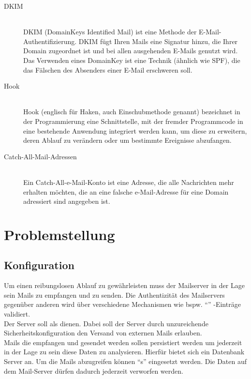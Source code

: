 \documentclass[a4paper,11pt,singlespacing]{article}
\begin{document}
\begin{description}
	\item[DKIM\label{itm:DKIM}]\hfill \\
		DKIM (DomainKeys Identified Mail) ist eine Methode der E-Mail-Authentifizierung. DKIM fügt Ihren Mails eine Signatur hinzu, die Ihrer Domain zugeordnet ist und bei allen ausgehenden E-Mails genutzt wird. Das Verwenden eines DomainKey ist eine Technik (ähnlich wie SPF), die das Fälschen des Absenders einer E-Mail erschweren soll.\cite{DKIM}
	\item[Hook\label{itm:Hook}]\hfill \\
		Hook (englisch für Haken, auch Einschubmethode genannt) bezeichnet in der Programmierung eine Schnittstelle, mit der fremder Programmcode in eine bestehende Anwendung integriert werden kann, um diese zu erweitern, deren Ablauf zu verändern oder um bestimmte Ereignisse abzufangen.\cite{Hook}
	\item[Catch-All-Mail-Adressen\label{itm:Catch-All-Mail}]\hfill \\
		Ein Catch-All-e-Mail-Konto ist eine Adresse, die alle Nachrichten mehr erhalten möchten, die an eine falsche e-Mail-Adresse für eine Domain adressiert sind angegeben ist.\cite{Catch-All-Mail}
	\end{description}


\section{Problemstellung}\label{sec:Problemstellung}
	\subsection{Konfiguration}\label{sec:ProblemstellungKonfiguration}
		Um einen reibungslosen Ablauf zu gewährleisten muss der Mailserver in der Lage sein Mails zu empfangen und zu senden.
		Die Authentizität des Mailservers gegenüber anderen wird über verschiedene Mechanismen wie bspw. "`"' -Einträge validiert.
		\\
		Der Server soll als  dienen.
		Dabei soll der Server durch unzureichende Sicherheitskonfiguration den Versand von externen Mails erlauben.
		\\
		Mails die empfangen und gesendet werden sollen persistiert werden um jederzeit in der Lage zu sein diese Daten zu analysieren.
		Hierfür bietet sich ein Datenbank Server an. Um die Mails abzugreifen können "`s"' eingesetzt werden.
		Die Daten auf dem Mail-Server dürfen dadurch jederzeit verworfen werden.
\end{document}
